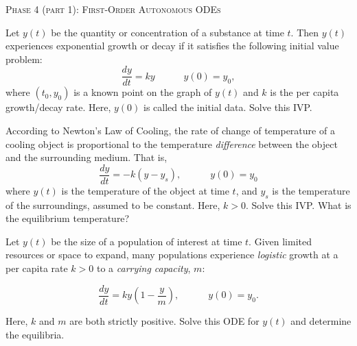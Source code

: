 \documentclass[10pt]{article}
\begin{document}
\begin{center}
\Large{\textsc{Phase 4 (part 1): First-Order Autonomous ODEs}}\\
\end{center}





\begin{enumerate}[{$1.]$}]

\item Let $y(t)$ be the quantity or concentration of a substance at time $t$.  Then $y(t)$ experiences exponential growth or decay if it satisfies the following initial value problem: 
\[ \frac{dy}{dt} = ky \qquad \quad y(0) = y_0, \]
where $(t_0, y_0)$ is a known point on the graph of $y(t)$ and $k$ is the per capita growth/decay rate.  Here, $y(0)$ is called the initial data. Solve this IVP.  \vfill



\item According to Newton's Law of Cooling, the rate of change of temperature of a cooling object is proportional to the temperature \textit{difference} between the object and the surrounding medium.  That is, 
\[ \frac{dy}{dt} = -k \left( y - y_s\right), \qquad \quad y(0) = y_0 \]
where $y(t)$ is the temperature of the object at time $t$, and $y_s$ is the temperature of the surroundings, assumed to be constant.  Here, $k>0$.  Solve this IVP.  What is the equilibrium temperature? \vfill \vfill



\pagebreak 
\item Let $y(t)$ be the size of a population of interest at time $t$.  Given limited resources or space to expand, many populations experience \textit{logistic} growth at a per capita rate $k>0$ to a \textit{carrying capacity}, $m$:

\[ \frac{dy}{dt} =ky \left( 1 - \frac{y}{m}\right), \qquad \quad y(0) = y_0 .\]

Here, $k$ and $m$ are both strictly positive.  Solve this ODE for $y(t)$ and determine the equilibria. 

\end{enumerate}
\end{document}
